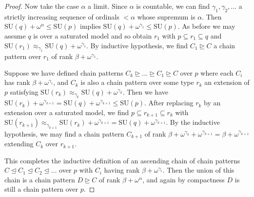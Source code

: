 \documentclass{article}
\theoremstyle{remark}
\theoremstyle{definition}
\begin{document}
\begin{proof}
    Now take the case $\alpha$ a limit. Since $\alpha$ is countable, we can find $\gamma_1,\gamma_2,\dots$ a strictly increasing sequence of ordinals $<\alpha$ whose supremum is $\alpha$. Then $\mathrm{SU}(q)+\omega^\alpha\leq \mathrm{SU}(p)$ implies $\mathrm{SU}(q)+\omega^{\gamma_1}\leq\mathrm{SU}(p)$. As before we may assume $q$ is over a saturated model and so obtain $r_1$ with $p\subseteq r_1\subseteq q$ and $\mathrm{SU}(r_1)\approx_{\gamma_1}\mathrm{SU}(q)+\omega^{\gamma_1}$. By inductive hypothesis, we find $C_{1}\trianglerighteq C$ a chain pattern over $r_1$ of rank $\beta+\omega^{\gamma_1}$. 
    
    Suppose we have defined chain patterns $C_k\trianglerighteq\dots\trianglerighteq C_1\trianglerighteq C
    $ over $p$ where each $C_i$ has rank $\beta+\omega^{\gamma_i}$, and $C_k$ is also a chain pattern over some type $r_k$ an extension of $p$ satisfying $\mathrm{SU}(r_k)\approx_{\gamma_k}\mathrm{SU}(q)+\omega^{\gamma_k}$. Then we have $\mathrm{SU}(r_k)+\omega^{\gamma_{k+1}}= \mathrm{SU}(q)+\omega^{\gamma_{k+1}}\leq \mathrm{SU}(p)$. After replacing $r_k$ by an extension over a saturated model, we find $p\subseteq r_{k+1}\subseteq r_{k}$ with $\mathrm{SU}(r_{k+1})\approx_{\gamma_{k+1}}\mathrm{SU}(r_k)+\omega^{\gamma_{k+1}}=\mathrm{SU}(q)+\omega^{\gamma_{k+1}}$. By the inductive hypothesis, we may find a chain pattern $C_{k+1}$ of rank $\beta+\omega^{\gamma_k}+\omega^{\gamma_{k+1}}=\beta+\omega^{\gamma_{k+1}}$ extending $C_k$ over $r_{k+1}$. 
    
    This completes the inductive definition of an ascending chain of chain patterns $C\trianglelefteq C_1\trianglelefteq C_2\trianglelefteq\dots$ over $p$ with $C_i$ having rank $\beta+\omega^{\gamma_i}$. Then the union of this chain is a chain pattern $D\trianglerighteq C$ of rank $\beta+\omega^\alpha$, and again by compactness $D$ is still a chain pattern over $p$.
    \end{proof}
\end{document}
